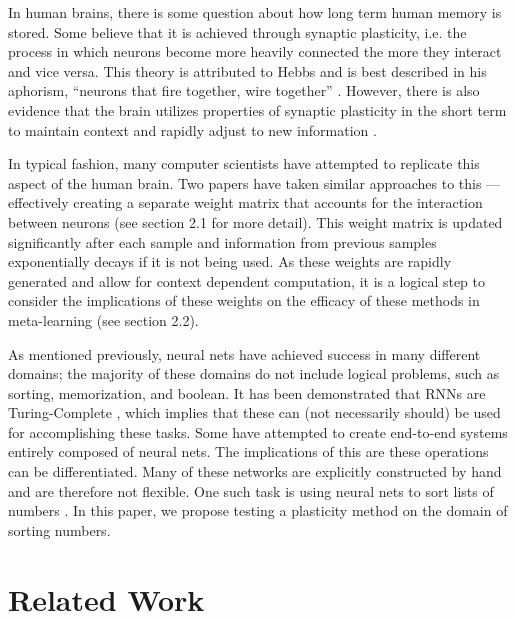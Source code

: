 \documentclass{article}
\begin{document}
In human brains, there is some question about how long term human memory is
stored. Some \cite{Martin00, Liu12} believe that it is achieved
through synaptic plasticity, i.e. the process in which neurons become more
heavily connected the more they interact and vice versa. This theory is
attributed to Hebbs and is best described in his aphorism, ``neurons that fire
together, wire together'' \cite{Hebb49}. However, there is also evidence that
the brain utilizes properties of synaptic plasticity in the short term to maintain
context and rapidly adjust to new information \cite{Tsodyks98, Abbott04, Barak07}.

In typical fashion, many computer scientists have attempted to replicate
this aspect of the human brain. Two papers \cite{BaHinton16, Miconi18} have taken
similar approaches to this --- effectively creating a separate weight matrix
that accounts for the interaction between neurons (see section 2.1 for more detail).
This weight matrix is updated significantly after each sample and information from
previous samples exponentially decays if it is not being used. As these weights
are rapidly generated and allow for context dependent computation, it is a logical
step to consider the implications of these weights on the efficacy of these
methods in meta-learning (see section 2.2).

As mentioned previously, neural nets have achieved success in many different domains;
the majority of these domains do not include logical problems, such as sorting,
memorization, and boolean. It has been
demonstrated that RNNs are Turing-Complete \cite{Siegelmann95}, which implies that these can (not necessarily should)
be used for accomplishing these tasks. Some have attempted to create end-to-end
systems entirely composed of neural nets. The implications of this are these operations can be differentiated. Many of these networks
are explicitly constructed by hand and are therefore not flexible. One such task
is using neural nets to sort lists of numbers \cite{sort1, sort2}. In this paper,
we propose testing a plasticity method on the domain of sorting numbers.


\section{Related Work}
\end{document}
